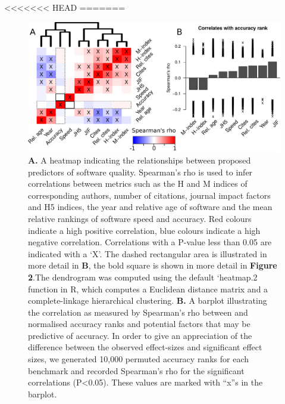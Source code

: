 \documentclass[fleqn,10pt]{SelfArx} %
\begin{document}
<<<<<<< HEAD
=======
\begin{figure}
\includegraphics[scale=0.7]{figure1.pdf}
\caption{\textbf{A.} A heatmap indicating the relationships between proposed predictors of software quality. Spearman’s rho is used to infer correlations between metrics such as the H and M indices of corresponding authors, number of citations, journal impact factors and H5 indices, the year and relative age of software and the mean relative rankings of software speed and accuracy. Red colours indicate a high positive correlation, blue colours indicate a high negative correlation. Correlations with a P-value less than 0.05 are indicated with a ‘X’. The dashed rectangular area is illustrated in more detail in \textbf{B}, the bold square is shown in more detail in \textbf{Figure 2}.The dendrogram was computed using the default ‘heatmap.2 function in R, which computes a Euclidean distance matrix and a complete-linkage hierarchical clustering. \textbf{B.} A barplot illustrating the correlation as measured by Spearman’s rho between and normalised accuracy ranks and potential factors that may be predictive of accuracy. In order to give an appreciation of the difference between the observed effect-sizes and significant effect sizes, we generated 10,000 permuted accuracy ranks for each benchmark and recorded Spearman’s rho for the significant correlations (P<0.05). These values are marked with “x”s in the barplot.}
\label{fig:allfactors}
\end{figure}
\end{document}
